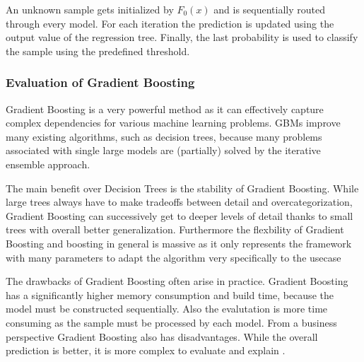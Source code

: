 An unknown sample gets initialized by \(F_{0}(x)\) and is sequentially routed through every model. For each iteration the 
prediction is updated using the output value of the regression tree. Finally, the last probability is used to classify 
the sample using the predefined threshold. 

\subsubsection{Evaluation of Gradient Boosting}

Gradient Boosting is a very powerful method as it can effectively capture complex dependencies for various machine 
learning problems. \ac{GBM}s improve many existing algorithms, such as decision trees, because many problems associated 
with single large models are (partially) solved by the iterative ensemble approach.

The main benefit over Decision Trees is the stability of Gradient Boosting. While large trees always have to make tradeoffs 
between detail and overcategorization, Gradient Boosting can successively get to deeper levels of detail thanks to 
small trees with overall better generalization. Furthermore the flexbility of Gradient Boosting and boosting in general is massive 
as it only represents the framework with many parameters to adapt the algorithm very specifically to the usecase \cite[7.2]{Natekin2013}

The drawbacks of Gradient Boosting often arise in practice. Gradient Boosting has a significantly higher memory consumption and 
build time, because the model must be constructed sequentially. Also the evalutation is more time consuming as the sample must be processed 
by each model. From a business perspective Gradient Boosting also has disadvantages. While the overall prediction is better, it is
more complex to evaluate and explain \cite[7.2]{Natekin2013} \cite[p.27]{Buhlmann2004Bagging}. 